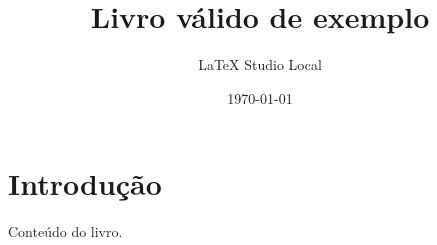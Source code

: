 \documentclass[11pt,a4paper]{book}
\title{Livro válido de exemplo}
\author{LaTeX Studio Local}
\date{\today}
\begin{document}
\frontmatter
\maketitle
\tableofcontents

\mainmatter
\chapter{Introdução}
Conteúdo do livro.


\end{document}
